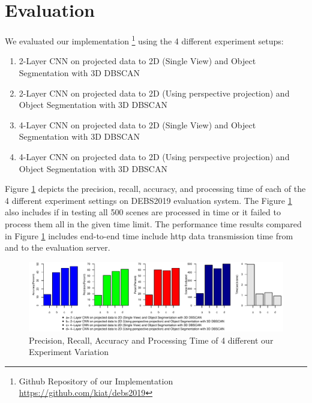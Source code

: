 \section{Evaluation}\label{sec:Evaluation}

We evaluated our implementation \footnote{Github Repository
of our Implementation \url{https://github.com/kiat/debs2019}} using the 4 different experiment
setups:
\begin{enumerate}
  \item 2-Layer CNN on projected data to 2D (Single View) and Object Segmentation with 3D DBSCAN
  \item 2-Layer CNN on projected data to 2D (Using perspective projection) and Object Segmentation with 3D DBSCAN
  \item 4-Layer CNN on projected data to 2D (Single View) and Object Segmentation with 3D DBSCAN
  \item 4-Layer CNN on projected data to 2D (Using perspective projection) and Object Segmentation with 3D DBSCAN
\end{enumerate}

Figure \ref{fig:evaluation2} depicts the precision, recall, accuracy, and processing time of each of the 4 different experiment settings on 
DEBS2019 evaluation system. The Figure \ref{fig:evaluation2} also includes if in testing
all 500 scenes are processed in time or it failed to process them all in the given time limit. The
performance time results compared in Figure \ref{fig:evaluation2} includes end-to-end time include
http  data transmission time from and to the evaluation server. 


\begin{figure}[htp]
\begin{center}
  \includegraphics[width=1\linewidth]{images/evaluation2.pdf}
  \caption{Precision, Recall, Accuracy and Processing Time of 4 different our Experiment Variation}
  \label{fig:evaluation2}
\end{center}
\end{figure}

